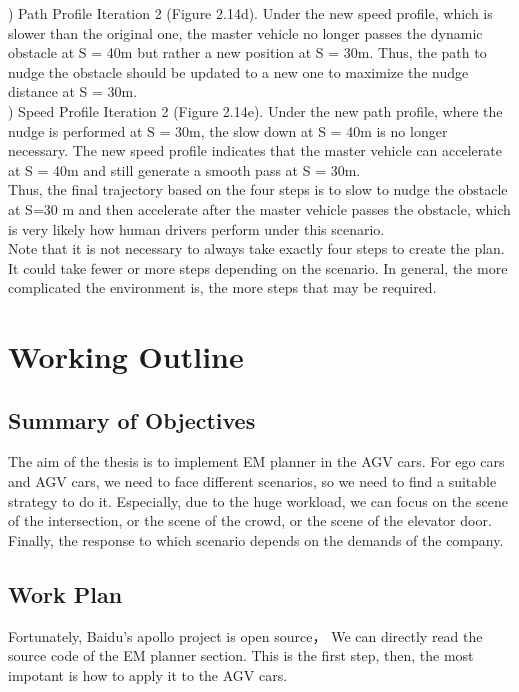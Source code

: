 \documentclass{report}
\begin{document}
) Path Profile Iteration 2 (Figure 2.14d). Under the new speed profile, which is slower than
the original one, the master vehicle no longer passes the dynamic obstacle at S = 40m but rather a new position at S = 30m. Thus, the path to nudge the obstacle should be updated to a new one to maximize the nudge distance at S = 30m.\\
) Speed Profile Iteration 2 (Figure 2.14e). Under the new path profile, where the nudge is performed at S = 30m, the slow down at S = 40m is no longer necessary. The new
speed profile indicates that the master vehicle can accelerate at S = 40m and still generate a smooth pass at S = 30m.\\
\indent
Thus, the final trajectory based on the four steps is to slow to nudge the obstacle at S=30 m and then accelerate after the master vehicle passes the obstacle, which is very likely how human drivers perform under this scenario.\\
\indent
Note that it is not necessary to always take
exactly four steps to create the plan. It could take
fewer or more steps depending on the scenario. In
general, the more complicated the environment is,
the more steps that may be required.
 \chapter{Working Outline}
 \section{Summary of Objectives}
 The aim of the thesis is to implement EM planner in the  AGV cars. For ego cars and AGV cars, we need to face different scenarios, so we need to find a suitable strategy to do it. Especially, due to the huge workload, we can focus on the scene of the intersection, or the scene of the crowd, or the scene of the elevator door.
 Finally, the response to which scenario depends on the demands of the company.
 \section{Work Plan}
 Fortunately, Baidu's apollo project is open source， We can directly read the source code of the EM planner section. This is the first step, then, the most impotant is how to apply it to the AGV cars.
\end{document}
